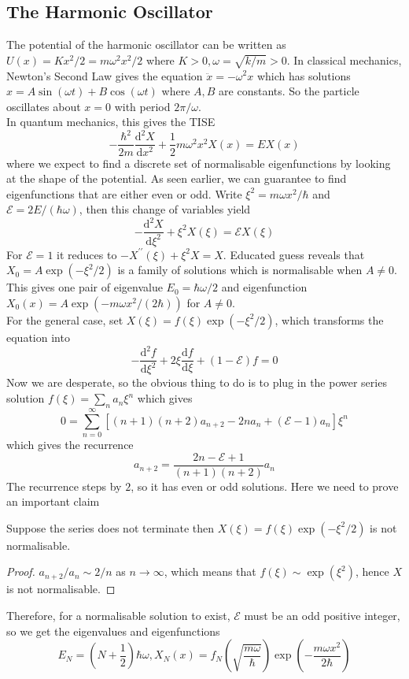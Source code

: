 \subsection{The Harmonic Oscillator}
The potential of the harmonic oscillator can be written as $U(x)=Kx^2/2=m\omega^2x^2/2$ where $K>0, \omega=\sqrt{k/m}>0$.
In classical mechanics, Newton's Second Law gives the equation $\ddot{x}=-\omega^2x$ which has solutions $x=A\sin(\omega t)+B\cos(\omega t)$ where $A,B$ are constants.
So the particle oscillates about $x=0$ with period $2\pi/\omega$.\\
In quantum mechanics, this gives the TISE
$$-\frac{\hbar^2}{2m}\frac{\mathrm d^2X}{\mathrm dx^2}+\frac{1}{2}m\omega^2x^2X(x)=EX(x)$$
where we expect to find a discrete set of normalisable eigenfunctions by looking at the shape of the potential.
As seen earlier, we can guarantee to find eigenfunctions that are either even or odd.
Write $\xi^2=m\omega x^2/\hbar$ and $\mathcal E=2E/(\hbar\omega)$, then this change of variables yield
$$-\frac{\mathrm d^2X}{\mathrm d\xi^2}+\xi^2X(\xi)=\mathcal EX(\xi)$$
For $\mathcal E=1$ it reduces to $-X^{\prime\prime}(\xi)+\xi^2X=X$.
Educated guess reveals that $X_0=A\exp(-\xi^2/2)$ is a family of solutions which is normalisable when $A\neq 0$.
This gives one pair of eigenvalue $E_0=\hbar\omega/2$ and eigenfunction $X_0(x)=A\exp(-m\omega x^2/(2\hbar))$ for $A\neq 0$.\\
For the general case, set $X(\xi)=f(\xi)\exp(-\xi^2/2)$, which transforms the equation into
$$-\frac{\mathrm d^2f}{\mathrm d\xi^2}+2\xi\frac{\mathrm df}{\mathrm d\xi}+(1-\mathcal E)f=0$$
Now we are desperate, so the obvious thing to do is to plug in the power series solution $f(\xi)=\sum_na_n\xi^n$ which gives
$$0=\sum_{n=0}^\infty [(n+1)(n+2)a_{n+2}-2na_n+(\mathcal E-1)a_n]\xi^n$$
which gives the recurrence
$$a_{n+2}=\frac{2n-\mathcal E+1}{(n+1)(n+2)}a_n$$
The recurrence steps by $2$, so it has even or odd solutions.
Here we need to prove an important claim
\begin{claim}
    Suppose the series does not terminate then $X(\xi)=f(\xi)\exp(-\xi^2/2)$ is not normalisable.
\end{claim}
\begin{proof}
    $a_{n+2}/a_n\sim 2/n$ as $n\to\infty$, which means that $f(\xi)\sim\exp(\xi^2)$, hence $X$ is not normalisable.
\end{proof}
Therefore, for a normalisable solution to exist, $\mathcal E$ must be an odd positive integer, so we get the eigenvalues and eigenfunctions
$$E_N=\left( N+\frac{1}{2} \right)\hbar\omega,X_N(x)=f_N\left( \sqrt{\frac{m\omega}{\hbar}} \right)\exp\left( -\frac{m\omega x^2}{2\hbar} \right)$$
